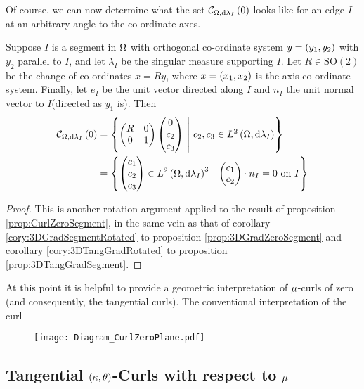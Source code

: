 Of course, we can now determine what the set $\mathcal{C}_{ \Omega, \mathrm{d}\lambda_I}\left( 0 \right)$ looks like for an edge $I$ at an arbitrary angle to the co-ordinate axes.
\begin{cory} \label{cory:CurlZeroRotated}
	Suppose $I$ is a segment in $\Omega$ with orthogonal co-ordinate system $y = \left( y_1, y_2 \right)$ with $y_2$ parallel to $I$, and let $\lambda_I$ be the singular measure supporting $I$. 
	Let $R\in\mathrm{SO}(2)$ be the change of co-ordinates $x = Ry$, where $x = \left( x_1, x_2 \right)$ is the axis co-ordinate system. 
	Finally, let $e_I$ be the unit vector directed along $I$ and $n_I$ the unit normal vector to $I$(directed as $y_1$ is). 
	Then
	\begin{align*}
		\mathcal{C}_{ \Omega, \mathrm{d}\lambda_I}\left( 0 \right) &= 
		\left\{  \begin{pmatrix} R & 0 \\ 0 & 1 \end{pmatrix} \begin{pmatrix} 0 \\ c_2 \\ c_3 \end{pmatrix} \ \middle\vert \  c_2,c_3\in L^{2}\left( \Omega,\mathrm{d}\lambda_I \right)  \right\} \\
		&= \left\{  \begin{pmatrix} c_1 \\ c_2 \\ c_3 \end{pmatrix}\in L^{2}\left( \Omega,\mathrm{d}\lambda_I \right)^3 \ \middle\vert \  \begin{pmatrix} c_1 \\ c_2 \end{pmatrix} \cdot n_I = 0 \text{ on } I  \right\}
	\end{align*}
\end{cory}
\begin{proof}
	This is another rotation argument applied to the result of proposition \ref{prop:CurlZeroSegment}, in the same vein as that of corollary \ref{cory:3DGradSegmentRotated} to proposition \ref{prop:3DGradZeroSegment} and corollary \ref{cory:3DTangGradRotated} to proposition \ref{prop:3DTangGradSegment}.
\end{proof}

At this point it is helpful to provide a geometric interpretation of $\mu$-curls of zero (and consequently, the tangential curls).
The conventional interpretation of the curl 
\begin{figure}[h!]
	\centering
	\texttt{[image: Diagram\_CurlZeroPlane.pdf]}
	\caption{\label{fig:Diagram_CurlZeroPlane}}
\end{figure}

\subsection{Tangential $\left( \kappa, \theta \right)$-Curls with respect to $\mu$} \label{apps:TangentialCurls}